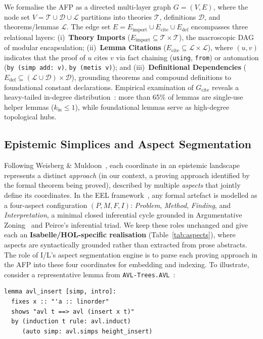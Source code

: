 \documentclass{svproc}
\begin{document}
We formalise the AFP as a directed multi-layer graph $G = (V, E)$, where the node set $V = \mathcal{T} \cup \mathcal{D} \cup \mathcal{L}$ partitions into theories $\mathcal{T}$, definitions $\mathcal{D}$, and theorems/lemmas $\mathcal{L}$. The edge set $E = E_{\text{import}} \cup E_{\text{cite}} \cup E_{\text{def}}$ encompasses three relational layers: (i)~\textbf{Theory Imports} ($E_{\text{import}} \subseteq \mathcal{T} \times \mathcal{T}$), the macroscopic DAG of modular encapsulation; (ii)~\textbf{Lemma Citations} ($E_{\text{cite}} \subseteq \mathcal{L} \times \mathcal{L}$), where $(u,v)$ indicates that the proof of $u$ cites $v$ via fact chaining (\texttt{using}, \texttt{from}) or automation (\texttt{by (simp add: v)}, \texttt{by (metis v)}); and (iii)~\textbf{Definitional Dependencies} ($E_{\text{def}} \subseteq (\mathcal{L} \cup \mathcal{D}) \times \mathcal{D}$), grounding theorems and compound definitions to foundational constant declarations. Empirical examination of $G_{\text{cite}}$ reveals a heavy-tailed in-degree distribution~\cite{newman_structure_2003}: more than 65\% of lemmas are single-use helper lemmas ($k_{\text{in}} \le 1$), while foundational lemmas serve as high-degree topological hubs.

\subsection{Epistemic Simplices and Aspect Segmentation}\label{sec:simplices}

Following Weisberg \& Muldoon~\cite{weisberg_epistemic_2009}, each coordinate in an epistemic landscape represents a distinct \emph{approach} (in our context, a proving approach identified by the formal theorem being proved), described by multiple \emph{aspects} that jointly define its coordinates. In the EEL framework~\cite{correia_eel_inprep,correia_embedding-based_2026}, any formal artefact is modelled as a four-aspect configuration $(P, M, F, I)$: \emph{Problem}, \emph{Method}, \emph{Finding}, and \emph{Interpretation}, a minimal closed inferential cycle grounded in Argumentative Zoning~\cite{teufel_summarizing_2002} and Peirce's inferential triad. We keep these roles unchanged and give each an \textbf{Isabelle/HOL-specific realisation} (Table~\ref{tab:aspects}), where aspects are syntactically grounded rather than extracted from prose abstracts. The role of I/L's aspect segmentation engine is to parse each proving approach in the AFP into these four coordinates for embedding and indexing. To illustrate, consider a representative lemma from \texttt{AVL-Trees.AVL}~\cite{Nipkow-AFP-AVL_Trees}:
\begin{lstlisting}[language=isabelle]
lemma avl_insert [simp, intro]:
  fixes x :: "'a :: linorder"
  shows "avl t ==> avl (insert x t)"
  by (induction t rule: avl.induct)
     (auto simp: avl.simps height_insert)
\end{lstlisting}
\end{document}
